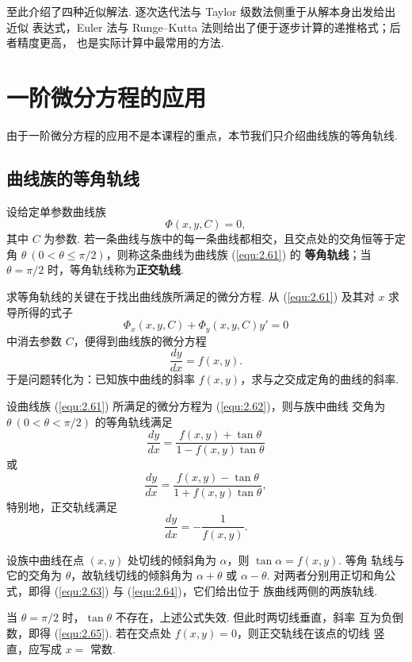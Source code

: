 至此介绍了四种近似解法. 逐次迭代法与 Taylor 级数法侧重于从解本身出发给出近似
表达式，Euler 法与 Runge--Kutta 法则给出了便于逐步计算的递推格式；后者精度更高，
也是实际计算中最常用的方法.


\section{一阶微分方程的应用}\label{sec:2.7}
由于一阶微分方程的应用不是本课程的重点，本节我们只介绍曲线族的等角轨线.
\subsection{曲线族的等角轨线}
\begin{deff}[(等角轨线)]
设给定单参数曲线族
\begin{equation}\label{equ:2.61}
\Phi(x,y,C)=0,
\end{equation}
其中 $C$ 为参数. 若一条曲线与族中的每一条曲线都相交，且交点处的交角恒等于定角
$\theta\ (0<\theta\le\pi/2)$，则称这条曲线为曲线族 (\ref{equ:2.61}) 的
\textbf{等角轨线}；当 $\theta=\pi/2$ 时，等角轨线称为\textbf{正交轨线}.
\end{deff}

求等角轨线的关键在于找出曲线族所满足的微分方程. 从 (\ref{equ:2.61}) 及其对
$x$ 求导所得的式子
\[
\Phi_x(x,y,C)+\Phi_y(x,y,C)y'=0
\]
中消去参数 $C$，便得到曲线族的微分方程
\begin{equation}\label{equ:2.62}
\frac{dy}{dx}=f(x,y).
\end{equation}
于是问题转化为：已知族中曲线的斜率 $f(x,y)$，求与之交成定角的曲线的斜率.

\begin{thm}\label{thm:2.7.1}
设曲线族 (\ref{equ:2.61}) 所满足的微分方程为 (\ref{equ:2.62})，则与族中曲线
交角为 $\theta\ (0<\theta<\pi/2)$ 的等角轨线满足
\begin{equation}\label{equ:2.63}
\frac{dy}{dx}=\frac{f(x,y)+\tan\theta}{1-f(x,y)\tan\theta}
\end{equation}
或
\begin{equation}\label{equ:2.64}
\frac{dy}{dx}=\frac{f(x,y)-\tan\theta}{1+f(x,y)\tan\theta},
\end{equation}
特别地，正交轨线满足
\begin{equation}\label{equ:2.65}
\frac{dy}{dx}=-\frac{1}{f(x,y)}.
\end{equation}
\end{thm}
\begin{pf1}
设族中曲线在点 $(x,y)$ 处切线的倾斜角为 $\alpha$，则 $\tan\alpha=f(x,y)$. 等角
轨线与它的交角为 $\theta$，故轨线切线的倾斜角为 $\alpha+\theta$ 或 $\alpha-\theta$.
对两者分别用正切和角公式，即得 (\ref{equ:2.63}) 与 (\ref{equ:2.64})，它们给出位于
族曲线两侧的两族轨线.

当 $\theta=\pi/2$ 时，$\tan\theta$ 不存在，上述公式失效. 但此时两切线垂直，斜率
互为负倒数，即得 (\ref{equ:2.65}). 若在交点处 $f(x,y)=0$，则正交轨线在该点的切线
竖直，应写成 $x=$ 常数. 
\end{pf1}

